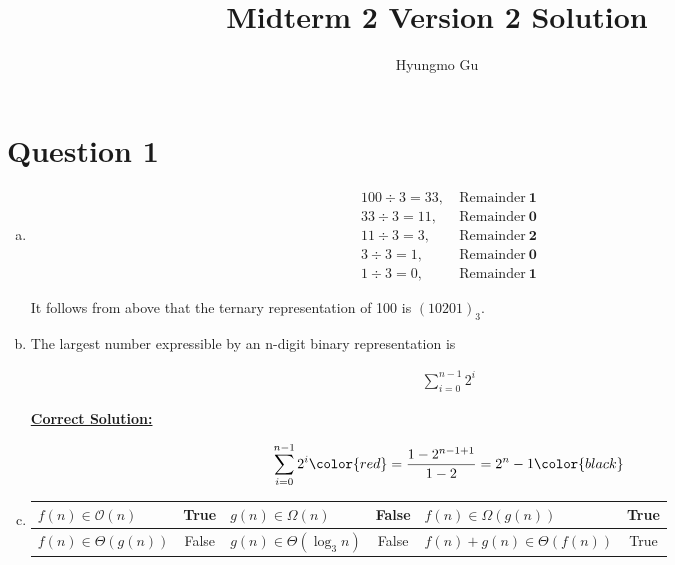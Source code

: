 \documentclass[12pt]{article}
\begin{document}
\title{Midterm 2 Version 2 Solution}
\author{Hyungmo Gu}
\maketitle

\section*{Question 1}
\begin{enumerate}[a.]
    \item

    \begin{align*}
        100 \div 3 = 33,&\:\text{Remainder}\:\textbf{1}\\
        33 \div 3 = 11,&\:\text{Remainder}\:\textbf{0}\\
        11 \div 3 = 3,&\:\text{Remainder}\:\textbf{2}\\
        3 \div 3 = 1,&\:\text{Remainder}\:\textbf{0}\\
        1 \div 3 = 0,&\:\text{Remainder}\:\textbf{1}
    \end{align*}

    \bigskip

    It follows from above that the ternary representation of 100 is $(10201)_3$.

    \item The largest number expressible by an n-digit binary representation is

    \setcounter{equation}{0}
    \begin{align}
        \sum\limits_{i=0}^{n-1} 2^i
    \end{align}

    \begin{mdframed}
        \underline{\textbf{Correct Solution:}}

        \setcounter{equation}{0}
        \begin{align}
            \sum\limits_{i=0}^{n-1} 2^i \color{red}= \frac{1 - 2^{n-1+1}}{1-2} = 2^n-1\color{black}
        \end{align}
    \end{mdframed}

    \item

    \begin{tabular}{|l|c|l|c|l|c|}
        \hline
        $f(n) \in \mathcal{O}(n)$ & True & $g(n) \in \Omega(n)$ & False & $f(n) \in \Omega(g(n))$ & True\\
        \hline
        $f(n) \in \Theta(g(n))$ & False & $g(n) \in \Theta(\log_3 n)$ & False & $f(n) + g(n) \in \Theta(f(n))$ & True\\
        \hline
    \end{tabular}


\end{enumerate}
\end{document}
